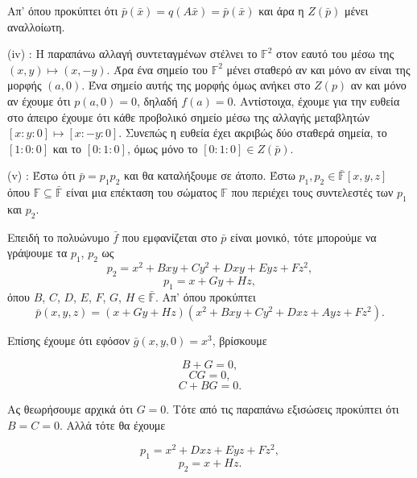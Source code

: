 \documentclass[12pt, a4paper]{book}
\begin{document}
Απ' όπου προκύπτει ότι $\bar{p}(\bar{x})=q(A\bar{x}) = \bar{p}(\bar{x})$ και άρα η $Z(\bar{p})$ μένει αναλλοίωτη.

\textlatin{(iv)} : Η παραπάνω αλλαγή συντεταγμένων στέλνει το $\mathbb{F}^2$ στον εαυτό του μέσω της $(x,y) \mapsto (x,-y)$. Άρα ένα σημείο του $\mathbb{F}^2$ μένει σταθερό αν και μόνο αν είναι της μορφής $(a,0)$. Ένα σημείο αυτής της μορφής όμως ανήκει στο $Z(p)$ αν και μόνο αν έχουμε ότι $p(a,0)=0$, δηλαδή $f(a)=0$. Αντίστοιχα, έχουμε για την ευθεία στο άπειρο έχουμε ότι κάθε προβολικό σημείο μέσω της αλλαγής μεταβλητών $[x:y:0] \mapsto [x:-y:0]$. Συνεπώς η ευθεία έχει ακριβώς δύο σταθερά σημεία, το $[1:0:0]$ και το $[0:1:0]$, όμως μόνο το $[0:1:0] \in Ζ(\bar{p})$.

\textlatin{(v)} : Έστω ότι $\bar{p}=p_1p_2$ και θα καταλήξουμε σε άτοπο. Έστω $p_1,p_2 \in \mathbb{\bar{F}}[x,y,z]$ όπου $\mathbb{F} \subseteq \mathbb{\bar{F}}$ είναι μια επέκταση του σώματος $\mathbb{F}$ που περιέχει τους συντελεστές των $p_1$ και $p_2$.

Επειδή το πολυώνυμο $\bar{f}$ που εμφανίζεται στο $\bar{p}$ είναι μονικό, τότε μπορούμε να γράψουμε τα $p_1$, $p_2$ ως
\begin{displaymath}
p_2 = x^2+Bxy+Cy^2+Dxy+Eyz+Fz^2,
\end{displaymath}
\begin{displaymath}
p_1=x+Gy+Hz,
\end{displaymath}
όπου $B$, $C$, $D$, $E$, $F$, $G$, $H \in \mathbb{\bar{F}}$. Απ' όπου προκύπτει
\begin{displaymath}
\bar{p}(x,y,z)= (x+Gy+Hz) (x^2+Bxy+Cy^2+Dxz+Ayz+Fz^2).
\end{displaymath}

Επίσης έχουμε ότι εφόσον $\bar{g}(x,y,0)=x^3$, βρίσκουμε

\begin{equation}
B+G=0, 
\end{equation}
\begin{equation}
CG=0,
\end{equation}
\begin{equation}
C+BG=0.
\end{equation}


Ας θεωρήσουμε αρχικά ότι $G = 0$. Τότε από τις παραπάνω εξισώσεις προκύπτει ότι $B=C=0$. Αλλά τότε θα έχουμε

\begin{displaymath}
p_1=x^2+Dxz+Eyz+Fz^2,
\end{displaymath}
\begin{displaymath}
p_2=x+Hz.
\end{displaymath}
\end{document}
